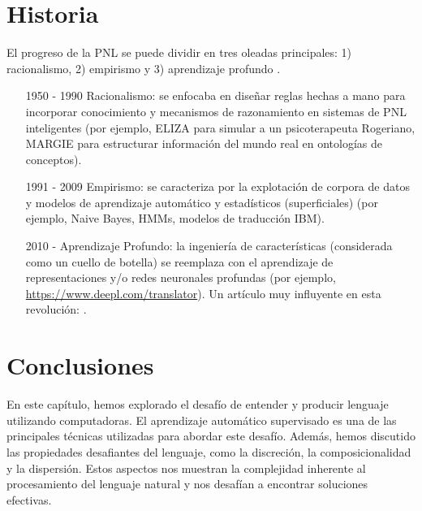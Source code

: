 \documentclass{book}
\begin{document}
\section{Historia}
El progreso de la PNL se puede dividir en tres oleadas principales: 1) racionalismo, 2) empirismo y 3) aprendizaje profundo \cite{deng2018deep}.
\begin{itemize}
   \item [1950 - 1990] Racionalismo: se enfocaba en diseñar reglas hechas a mano para incorporar conocimiento y mecanismos de razonamiento en sistemas de PNL inteligentes (por ejemplo, ELIZA para simular a un psicoterapeuta Rogeriano, MARGIE para estructurar información del mundo real en ontologías de conceptos).
   \item [1991 - 2009] Empirismo: se caracteriza por la explotación de corpora de datos y modelos de aprendizaje automático y estadísticos (superficiales) (por ejemplo, Naive Bayes, HMMs, modelos de traducción IBM).
   \item [2010 - ] Aprendizaje Profundo: la ingeniería de características (considerada como un cuello de botella) se reemplaza con el aprendizaje de representaciones y/o redes neuronales profundas (por ejemplo, \url{https://www.deepl.com/translator}). Un artículo muy influyente en esta revolución: \cite{collobert2011natural}.
\end{itemize}


\section{Conclusiones}


En este capítulo, hemos explorado el desafío de entender y producir lenguaje utilizando computadoras. El aprendizaje automático supervisado es una de las principales técnicas utilizadas para abordar este desafío. Además, hemos discutido las propiedades desafiantes del lenguaje, como la discreción, la composicionalidad y la dispersión. Estos aspectos nos muestran la complejidad inherente al procesamiento del lenguaje natural y nos desafían a encontrar soluciones efectivas.





\end{document}
